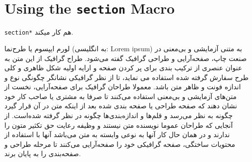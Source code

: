 \documentclass[11pt,largemargins]{homework}
\begin{document}
\section*{Using the \texttt{section} Macro}
\texttt{section*}
هم کار میکند.

  لورم ایپسوم یا طرح‌نما (به انگلیسی: Lorem ipsum) به متنی آزمایشی و بی‌معنی در صنعت چاپ، صفحه‌آرایی و طراحی گرافیک گفته می‌شود. طراح گرافیک از این متن به عنوان عنصری از ترکیب بندی برای پر کردن صفحه و ارایه اولیه شکل ظاهری و کلی طرح سفارش گرفته شده استفاده می نماید، تا از نظر گرافیکی نشانگر چگونگی نوع و اندازه فونت و ظاهر متن باشد. معمولا طراحان گرافیک برای صفحه‌آرایی، نخست از متن‌های آزمایشی و بی‌معنی استفاده می‌کنند تا صرفا به مشتری یا صاحب کار خود نشان دهند که صفحه طراحی یا صفحه بندی شده بعد از اینکه متن در آن قرار گیرد چگونه به نظر می‌رسد و قلم‌ها و اندازه‌بندی‌ها چگونه در نظر گرفته شده‌است. از آنجایی که طراحان عموما نویسنده متن نیستند و وظیفه رعایت حق تکثیر متون را ندارند و در همان حال کار آنها به نوعی وابسته به متن می‌باشد آنها با استفاده از محتویات ساختگی، صفحه گرافیکی خود را صفحه‌آرایی می‌کنند تا مرحله طراحی و صفحه‌بندی را به پایان برند.
\end{document}
